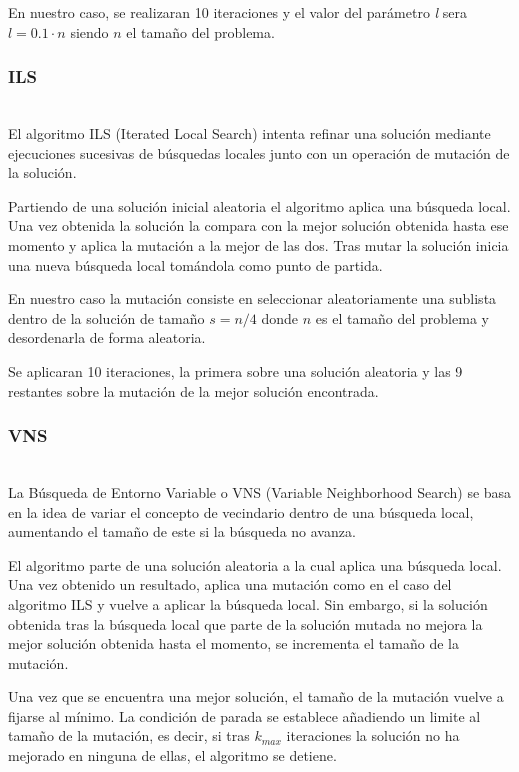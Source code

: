 \documentclass[runningheads,a4paper]{llncs}
\begin{document}
En nuestro caso, se realizaran 10 iteraciones y el valor del parámetro \emph{l} sera $l = 0.1 \cdot n $ siendo $n$ el tamaño del problema.

\subsubsection{ILS}
~\\

El algoritmo ILS (Iterated Local Search) intenta refinar una solución mediante ejecuciones sucesivas de búsquedas locales junto con un operación de mutación de la solución.

Partiendo de una solución inicial aleatoria el algoritmo aplica una búsqueda local. Una vez obtenida la solución la compara con la mejor solución obtenida hasta ese momento y aplica la mutación a la mejor de las dos. Tras mutar la solución inicia una nueva búsqueda local tomándola como punto de partida.

En nuestro caso la mutación consiste en seleccionar aleatoriamente una sublista dentro de la solución de tamaño $s = n/4 $ donde $n$ es el tamaño del problema y desordenarla de forma aleatoria.

Se aplicaran 10 iteraciones, la primera sobre una solución aleatoria y las 9 restantes sobre la mutación de la mejor solución encontrada.

\subsubsection{VNS}
~\\

La Búsqueda de Entorno Variable o VNS (Variable Neighborhood Search) se basa en la idea de variar el concepto de vecindario dentro de una búsqueda local, aumentando el tamaño de este si la búsqueda no avanza.

El algoritmo parte de una solución aleatoria a la cual aplica una búsqueda local. Una vez obtenido un resultado, aplica una mutación como en el caso del algoritmo ILS y vuelve a aplicar la búsqueda local. Sin embargo, si la solución obtenida tras la búsqueda local que parte de la solución mutada no mejora la mejor solución obtenida hasta el momento, se incrementa el tamaño de la mutación. 

Una vez que se encuentra una mejor solución, el tamaño de la mutación vuelve a fijarse al mínimo. La condición de parada se establece añadiendo un limite al tamaño de la mutación, es decir, si tras $k_{max}$ iteraciones la solución no ha mejorado en ninguna de ellas, el algoritmo se detiene.
\end{document}
